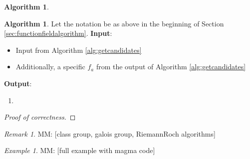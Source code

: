 \documentclass{dcthesis}
\newcommand{\mm}[1]{{\color{blue} \sf MM: [#1]}}
\newcommand{\wt}[1]{\widetilde{#1}}
\DeclareMathOperator{\sat}{sat}
\numberwithin{equation}{section}
\theoremstyle{definition}
\newtheorem{alg}[equation]{Algorithm}
\theoremstyle{remark}
\newtheorem{remark}[equation]{Remark}
\newtheorem{example}[equation]{Example}
\begin{document}
{{\begin{alg}
    \end{alg}
    \begin{alg}
      \label{alg:liftbelyimap}
      Let the notation be
      as above in the beginning of
      Section
      \ref{sec:functionfieldalgorithm}.
      \newline
      \textbf{Input}:
      \begin{itemize}
        \item
          Input from
          Algorithm
          \ref{alg:getcandidates}
        \item
          Additionally,
          a specific
          $f_a$ from the output of
          Algorithm
          \ref{alg:getcandidates}
      \end{itemize}
      \textbf{Output}:
      \begin{enumerate}
        \item 
      \end{enumerate}
    \end{alg}
    \begin{proof}[Proof of correctness]
    \end{proof}
    \begin{remark}
      \label{rmk:computationalremarks}
      \mm{class group, galois group,
      RiemannRoch algorithms}
    \end{remark}
    \begin{example}
      \label{exm:equationsinmagma}
      \mm{full example with magma code}
    \end{example}
  }
}
\end{document}
